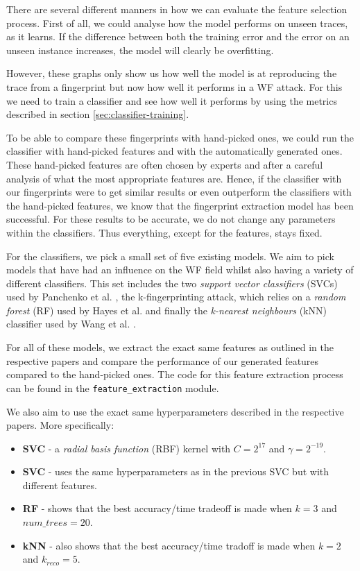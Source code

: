 There are several different manners in how we can evaluate the feature selection process.
First of all, we could analyse how the model performs on unseen traces, as it learns.
If the difference between both the training error and the error on an unseen instance increases, the model will clearly be overfitting.

However, these graphs only show us how well the model is at reproducing the trace from a fingerprint but now how well it performs in a WF attack.
For this we need to train a classifier and see how well it performs by using the metrics described in section \ref{sec:classifier-training}.

To be able to compare these fingerprints with hand-picked ones, we could run the classifier with hand-picked features and with the automatically generated ones.
These hand-picked features are often chosen by experts and after a careful analysis of what the most appropriate features are.
Hence, if the classifier with our fingerprints were to get similar results or even outperform the classifiers with the hand-picked features, we know that the fingerprint extraction model has been successful.
For these results to be accurate, we do not change any parameters within the classifiers.
Thus everything, except for the features, stays fixed.

For the classifiers, we pick a small set of five existing models.
We aim to pick models that have had an influence on the WF field whilst also having a variety of different classifiers.
This set includes the two \textit{support vector classifiers} (SVCs) used by Panchenko et al. \cite{panchenko1,panchenko2},
the k-fingerprinting attack, which relies on a \textit{random forest} (RF) used by Hayes et al. \cite{kfingerprinting}
and finally the \textit{k-nearest neighbours} (kNN) classifier used by Wang et al. \cite{wang_cai_johnson_nithyanand_goldberg_2014}.

For all of these models, we extract the exact same features as outlined in the respective papers and compare the performance of our generated features compared to the hand-picked ones.
The code for this feature extraction process can be found in the \texttt{feature\_extraction} module.

We also aim to use the exact same hyperparameters described in the respective papers. More specifically:
\begin{itemize}
  \item \textbf{SVC} \cite{panchenko1} - a \textit{radial basis function} (RBF) kernel with $C = 2^{17}$ and $\gamma = 2^{-19}$.
  \item \textbf{SVC} \cite{panchenko2} - uses the same hyperparameters as in the previous SVC but with different features.
  \item \textbf{RF} \cite{kfingerprinting} - shows that the best accuracy/time tradeoff is made when $k = 3$ and $\textit{num\_trees} = 20$.
  \item \textbf{kNN} \cite{wang_cai_johnson_nithyanand_goldberg_2014} - also shows that the best accuracy/time tradoff is made when $k = 2$ and $k_{\textit{reco}} = 5$.
\end{itemize}

